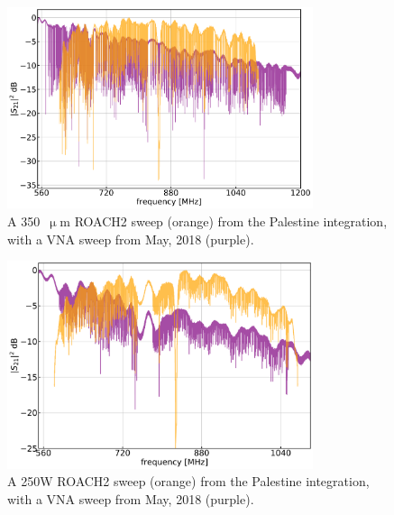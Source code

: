 \begin{figure}[!htbp]
\centering
\includegraphics[width=0.8\textwidth]{figures/blast_data/sweeps/350_VNA_overplot}
\caption[~A  ROACH2 sweep from the Palestine integration, with a VNA sweep from May, 2018.]{A 350~$\upmu$m ROACH2 sweep (orange) from the Palestine integration, with a VNA sweep from May, 2018 (purple).}
\label{fig:VNA comp 350}
\end{figure}

\begin{figure}[!htbp]
\centering
\includegraphics[width=0.8\textwidth]{figures/blast_data/sweeps/250W_VNA_overplot}
\caption[~A 250W ROACH2 sweep from the Palestine integration, with a VNA sweep from May, 2018.]{A 250W ROACH2 sweep (orange) from the Palestine integration, with a VNA sweep from May, 2018 (purple).}
\label{fig:VNA comp 250W}
\end{figure}

